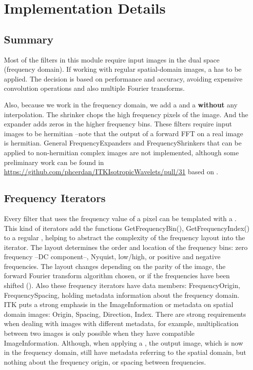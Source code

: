 \section{Implementation Details}
\label{sec:Impl}
\subsection{Summary}
\label{sub:Summary}

Most of the filters in this module require input images in the dual space (frequency domain). If working with regular spatial-domain images, a  has to be applied. The decision is based on performance and accuracy, avoiding expensive convolution operations and also multiple Fourier transforms.

Also, because we work in the frequency domain, we add a  and a  \textbf{without} any interpolation. The shrinker chops the high frequency pixels of the image. And the expander adds zeros in the higher frequency bins.
These filters require input images to be hermitian --note that the output of a forward FFT on a real image is hermitian.\newline
General FrequencyExpanders and FrequencyShrinkers that can be applied to non-hermitian complex images are not implemented, although some preliminary work can be found in \url{https://github.com/phcerdan/ITKIsotropicWavelets/pull/31} based on \cite{portilla_image_2003}.

\subsection{Frequency Iterators}
\label{sub:frequencyiterators}
Every filter that uses the frequency value of a pixel can be templated with a .\newline
This kind of iterators add the functions GetFrequencyBin(), GetFrequencyIndex() to a regular , helping to abstract the complexity of the frequency layout into the iterator.
The layout determines the order and location of the frequency bins: zero frequency --DC component--, Nyquist, low/high, or positive and negative frequencies. The layout changes depending on the parity of the image, the forward Fourier transform algorithm chosen, or if the frequencies have been shifted ().\newline
Also these frequency iterators have data members: FrequencyOrigin, FrequencySpacing, holding metadata information about the frequency domain.\newline
ITK puts a strong emphasis in the ImageInformation or metadata on spatial domain images: Origin, Spacing, Direction, Index. There are strong requirements when dealing with images with different metadata, for example, multiplication between two images is only possible when they have compatible ImageInformation.\newline
Although, when applying a , the output image, which is now in the frequency domain, still have metadata referring to the spatial domain, but nothing about the frequency origin, or spacing between frequencies.

